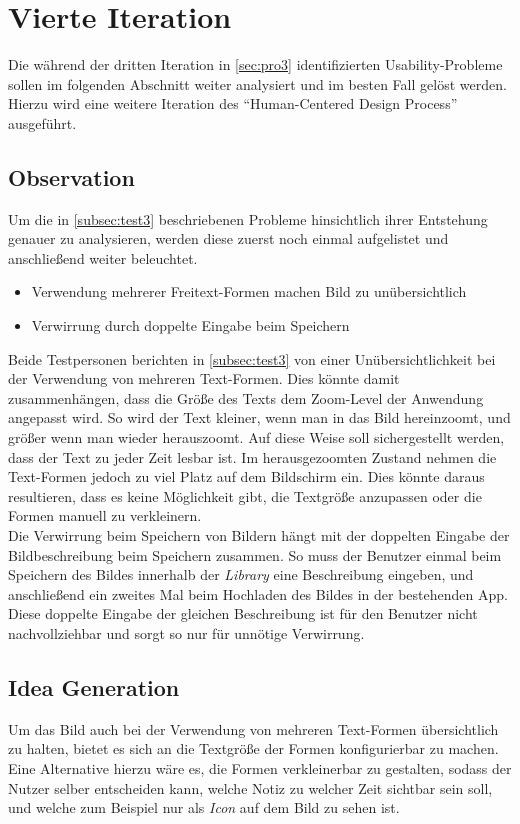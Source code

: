 \section{Vierte Iteration}
Die während der dritten Iteration in \autoref{sec:pro3} identifizierten Usability-Probleme sollen im folgenden Abschnitt weiter analysiert und im besten Fall gelöst werden.
Hierzu wird eine weitere Iteration des ``Human-Centered Design Process'' ausgeführt.

\subsection{Observation}
Um die in \autoref{subsec:test3} beschriebenen Probleme hinsichtlich ihrer Entstehung genauer zu analysieren, werden diese zuerst noch einmal aufgelistet und anschließend weiter beleuchtet.

\begin{itemize}
  \item Verwendung mehrerer Freitext-Formen machen Bild zu unübersichtlich
  \item Verwirrung durch doppelte Eingabe beim Speichern
\end{itemize}

\noindent
Beide Testpersonen berichten in \autoref{subsec:test3} von einer Unübersichtlichkeit bei der Verwendung von mehreren Text-Formen.
Dies könnte damit zusammenhängen, dass die Größe des Texts dem Zoom-Level der Anwendung angepasst wird.
So wird der Text kleiner, wenn man in das Bild hereinzoomt, und größer wenn man wieder herauszoomt.
Auf diese Weise soll sichergestellt werden, dass der Text zu jeder Zeit lesbar ist.
Im herausgezoomten Zustand nehmen die Text-Formen jedoch zu viel Platz auf dem Bildschirm ein.
Dies könnte daraus resultieren, dass es keine Möglichkeit gibt, die Textgröße anzupassen oder die Formen
manuell zu verkleinern. \\

Die Verwirrung beim Speichern von Bildern hängt mit der doppelten Eingabe der Bildbeschreibung beim Speichern zusammen.
So muss der Benutzer einmal beim Speichern des Bildes innerhalb der \emph{Library} eine Beschreibung eingeben, und anschließend ein zweites Mal beim Hochladen des Bildes in der bestehenden App.
Diese doppelte Eingabe der gleichen Beschreibung ist für den Benutzer nicht nachvollziehbar und sorgt so nur für unnötige Verwirrung. \\

\subsection{Idea Generation}\label{subsec:idea4}
Um das Bild auch bei der Verwendung von mehreren Text-Formen übersichtlich zu halten, bietet es sich an die Textgröße der Formen konfigurierbar zu machen.
Eine Alternative hierzu wäre es, die Formen verkleinerbar zu gestalten, sodass der Nutzer selber entscheiden kann, welche Notiz zu welcher Zeit sichtbar sein soll, und welche zum Beispiel nur als \emph{Icon} auf dem Bild zu sehen ist. \\

